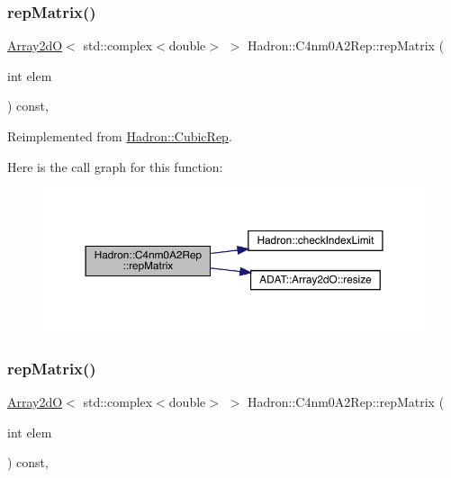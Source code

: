 \subsubsection{\texorpdfstring{repMatrix()}{repMatrix()}\hspace{0.1cm}{\footnotesize\ttfamily [1/2]}}
{\footnotesize\ttfamily \mbox{\hyperlink{classADAT_1_1Array2dO}{Array2dO}}$<$ std\+::complex$<$double$>$ $>$ Hadron\+::\+C4nm0\+A2\+Rep\+::rep\+Matrix (\begin{DoxyParamCaption}\item[{int}]{elem }\end{DoxyParamCaption}) const\hspace{0.3cm}{\ttfamily [inline]}, {\ttfamily [virtual]}}



Reimplemented from \mbox{\hyperlink{structHadron_1_1CubicRep_ac5d7e9e6f4ab1158b5fce3e4ad9e8005}{Hadron\+::\+Cubic\+Rep}}.

Here is the call graph for this function\+:
\nopagebreak
\begin{figure}[H]
\begin{center}
\leavevmode
\includegraphics[width=350pt]{d2/db9/structHadron_1_1C4nm0A2Rep_aac52fe57a274d94bbaef9c6b2699e1c9_cgraph}
\end{center}
\end{figure}
\mbox{\label{structHadron_1_1C4nm0A2Rep_aac52fe57a274d94bbaef9c6b2699e1c9}} 
\subsubsection{\texorpdfstring{repMatrix()}{repMatrix()}\hspace{0.1cm}{\footnotesize\ttfamily [2/2]}}
{\footnotesize\ttfamily \mbox{\hyperlink{classADAT_1_1Array2dO}{Array2dO}}$<$ std\+::complex$<$double$>$ $>$ Hadron\+::\+C4nm0\+A2\+Rep\+::rep\+Matrix (\begin{DoxyParamCaption}\item[{int}]{elem }\end{DoxyParamCaption}) const\hspace{0.3cm}{\ttfamily [inline]}, {\ttfamily [virtual]}}



